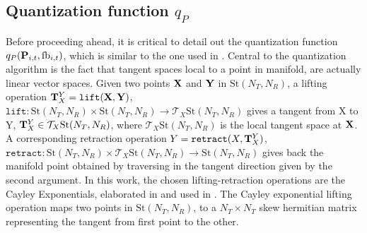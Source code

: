 \documentclass[conference]{IEEEtran}
\begin{document}
\subsection{Quantization function $q_P$}
Before proceeding ahead, it is critical to detail out the quantization function $q_P({\bf P}_{i,t},\text{fb}_{i,t})$, which is similar to the one used in \cite{6891198,Gupt1905:Predictive,6545375}. 
Central to the quantization algorithm is the fact that tangent spaces local to a point in manifold, are actually linear vector spaces.
Given two points ${\bf X}$ and ${\bf Y}$ in $\text{St}(N_T,N_R)$, a lifting operation ${\bf T}^Y_X=\texttt{lift}({\bf X},{\bf Y})$, $\texttt{lift}:\text{St}(N_T,N_R)\times \text{St}(N_T,N_R) \to \mathcal{T}_X \text{St}(N_T,N_R)$ gives a tangent from X to Y, ${\bf T}^Y_X \in \mathcal{T}_X \text{St}(N_T,N_R)$, where $\mathcal{T}_X \text{St}(N_T,N_R)$ is the local tangent space at ${\bf X}$.
A corresponding retraction operation $Y=\texttt{retract}(X,{\bf T}^Y_X)$, $\texttt{retract}: \text{St}(N_T,N_R)\times \mathcal{T}_X \text{St}(N_T,N_R) \to \text{St}(N_T,N_R)$ gives back the manifold point obtained by traversing in the tangent direction given by the second argument.
In this work, the chosen lifting-retraction operations are the Cayley Exponentials, elaborated in \cite{DBLP:journals/corr/abs-1708-00045} and used in \cite{Gupt1905:Predictive}.
The Cayley exponential lifting operation maps two points in $\text{St}(N_T,N_R)$, to a $N_T\times N_T$ skew hermitian matrix representing the tangent from first point to the other. 
\end{document}
